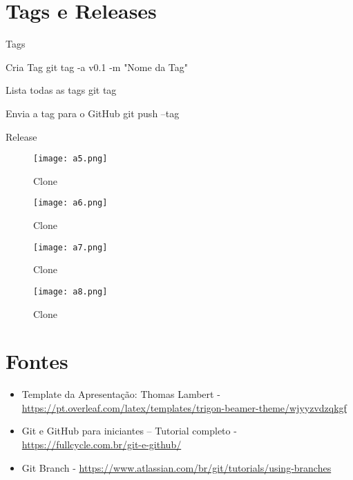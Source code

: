 \documentclass[aspectratio=169]{beamer}
\begin{document}
\section{Tags e Releases}
\begin{frame}{Tags}
	\begin{block}{Cria Tag}
		git tag -a v0.1 -m "Nome da Tag"
	\end{block}
	\begin{block}{Lista todas as tags}
		git tag
	\end{block}
	\begin{block}{Envia a tag para o GitHub}
		git push --tag
	\end{block}
	
	
	
	
\end{frame}
\begin{frame}{Release}
	\begin{figure}
		\centering
		\texttt{[image: a5.png]}
		\caption{Clone}
	\end{figure}
\end{frame}
\begin{frame}
	\begin{figure}
		\centering
		\texttt{[image: a6.png]}
		\caption{Clone}
	\end{figure}
\end{frame}
\begin{frame}
	\begin{figure}
		\centering
		\texttt{[image: a7.png]}
		\caption{Clone}
	\end{figure}
\end{frame}
\begin{frame}
	\begin{figure}
		\centering
		\texttt{[image: a8.png]}
		\caption{Clone}
	\end{figure}
\end{frame}

\section{Fontes}
\begin{frame}
	\begin{itemize}
		\item Template da Apresentação: Thomas Lambert - \url{https://pt.overleaf.com/latex/templates/trigon-beamer-theme/wjyyzvdzqkgf}
		\item Git e GitHub para iniciantes – Tutorial completo - \url{https://fullcycle.com.br/git-e-github/}
		\item Git Branch - \url{https://www.atlassian.com/br/git/tutorials/using-branches}
	\end{itemize}
	\end{frame}
\end{document}
